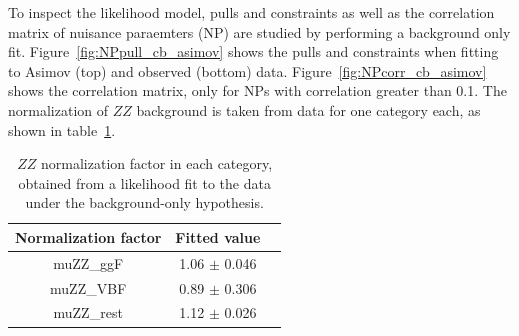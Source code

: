 To inspect the likelihood model, pulls and constraints as well as the correlation matrix of nuisance paraemters (NP) are studied by performing a background only fit.
Figure~\ref{fig:NPpull_cb_asimov} shows the pulls and constraints when fitting to Asimov (top) and observed (bottom) data.
Figure~\ref{fig:NPcorr_cb_asimov} shows the correlation matrix, only for NPs with correlation greater than 0.1.
The normalization of $ZZ$ background is taken from data for one category each, as shown in table~\ref{tab:muZZ_bonly_dnn}.

\begin{table}[htbp]
  \centering
  \caption{$ZZ$ normalization factor in each category, obtained from a likelihood fit to the data under the background-only hypothesis.}
  \label{tab:muZZ_bonly_dnn}
  \small
  \begin{spacing}{0.8}
  \begin{tabular}{ccc}
    \toprule
     Normalization factor  & Fitted value \\
    \midrule
    muZZ\_ggF  & 1.06 $\pm$ 0.046 \\
    \hline
    muZZ\_VBF  & 0.89 $\pm$ 0.306 \\
    \hline
    muZZ\_rest & 1.12 $\pm$ 0.026 \\
    \bottomrule
  \end{tabular}
  \end{spacing}
\end{table}

